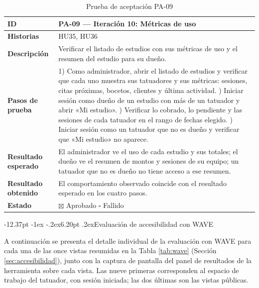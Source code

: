 \documentclass[12pt,letterpaper,oneside]{report}
\makeatletter
\renewcommand\section{\@startsection{section}{1}{\z@}%
  {-12.37pt \@plus -1ex \@minus -.2ex}{6.20pt \@plus.2ex}{\normalfont\large\bfseries}}
\makeatother
\begin{document}
\begin{table}[H]
  \centering
  \caption{Prueba de aceptación PA-09}
  \label{tab:pa09anexo}
  \renewcommand{\arraystretch}{1.3}
  \small
  \begin{tabular}{|>{\raggedright\arraybackslash}p{3.6cm}|p{9.4cm}|}
    \hline
    \textbf{ID} & PA-09 — Iteración 10: Métricas de uso \\ \hline
    \textbf{Historias} & HU35, HU36 \\ \hline
    \textbf{Descripción} & Verificar el listado de estudios con sus métricas de uso y el resumen del estudio para su dueño. \\ \hline
    \textbf{Pasos de prueba} &
      1) Como administrador, abrir el listado de estudios y verificar que cada uno muestra sus tatuadores y sus métricas: sesiones, citas próximas, bocetos, clientes y última actividad. \newline
      2) Iniciar sesión como dueño de un estudio con más de un tatuador y abrir «Mi estudio». \newline
      3) Verificar lo cobrado, lo pendiente y las sesiones de cada tatuador en el rango de fechas elegido. \newline
      4) Iniciar sesión como un tatuador que no es dueño y verificar que «Mi estudio» no aparece. \\ \hline
    \textbf{Resultado esperado} & El administrador ve el uso de cada estudio y sus totales; el dueño ve el resumen de montos y sesiones de su equipo; un tatuador que no es dueño no tiene acceso a ese resumen. \\ \hline
    \textbf{Resultado obtenido} & El comportamiento observado coincide con el resultado esperado en los cuatro pasos. \\ \hline
    \textbf{Estado} & $\boxtimes$ Aprobado \qquad $\square$ Fallido \\ \hline
  \end{tabular}
\end{table}

\section{Evaluación de accesibilidad con WAVE}
\label{anx:wave}

A continuación se presenta el detalle individual de la evaluación con WAVE para cada una de las once vistas resumidas en la Tabla \ref{tab:wave} (Sección \ref{sec:accesibilidad}), junto con la captura de pantalla del panel de resultados de la herramienta sobre cada vista. Las nueve primeras corresponden al espacio de trabajo del tatuador, con sesión iniciada; las dos últimas son las vistas públicas.
\end{document}

